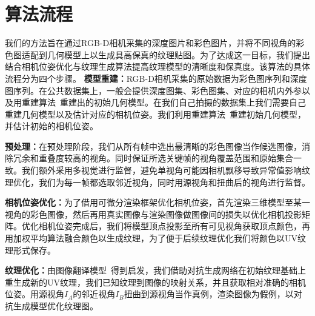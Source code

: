 \section{算法流程}
我们的方法旨在通过RGB-D相机采集的深度图片和彩色图片，并将不同视角的彩色图适配到几何模型上以生成具高保真的纹理贴图。为了达成这一目标，我们提出结合相机位姿优化与纹理生成算法提高纹理模型的清晰度和保真度。该算法的具体流程分为四个步骤。
\noindent\textbf{模型重建：}RGB-D相机采集的原始数据为彩色图序列和深度图序列。在公共数据集上，一般会提供深度图集、彩色图集、对应的相机内外参以及用重建算法~\cite{SungjoonChoi2015RobustRO,AngelaDai2016BundleFusionRG,RichardNewcombe2011KinectFusionRD}重建出的初始几何模型。在我们自己拍摄的数据集上我们需要自己重建几何模型以及估计对应的相机位姿。我们利用重建算法~\cite{LongYang2018SurfaceRV}重建初始几何模型，并估计初始的相机位姿。\par
\noindent\textbf{预处理：}在预处理阶段，我们从所有帧中选出最清晰的彩色图像当作候选图像，消除冗余和重叠度较高的视角。同时保证所选关键帧的视角覆盖范围和原始集合一致。我们额外采用多视觉进行监督，避免单视角可能因相机飘移导致异常值影响纹理优化，我们为每一帧都选取邻近视角，同时用源视角和扭曲后的视角进行监督。\par
\noindent\textbf{相机位姿优化：}为了借用可微分渲染框架优化相机位姿，首先渲染三维模型至某一视角的彩色图像，然后再用真实图像与渲染图像做图像间的损失以优化相机投影矩阵。优化相机位姿完成后，我们将模型顶点投影至所有可见视角获取顶点颜色，再用加权平均算法融合颜色以生成纹理，为了便于后续纹理优化我们将颜色以UV纹理形式保存。\par
\noindent\textbf{纹理优化：}由图像翻译模型~\cite{isola2017image,wang2018high}得到启发，我们借助对抗生成网络在初始纹理基础上重生成新的UV纹理，我们已知纹理到图像的映射关系，并且获取相对准确的相机位姿。用源视角$I_A$的邻近视角$I_B$扭曲到源视角当作真例，渲染图像为假例，以对抗生成模型优化纹理图。\par

